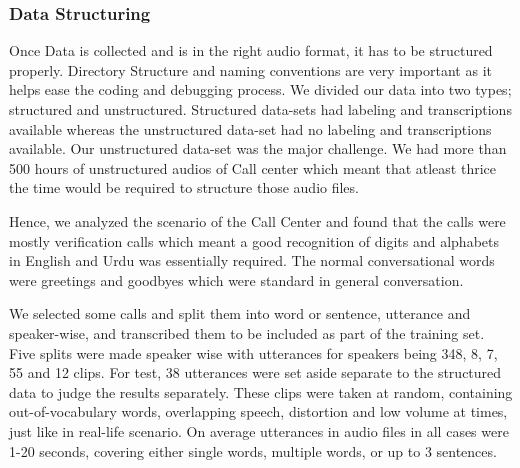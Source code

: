 \documentclass[a4paper, 11pt]{article}
\begin{document}

\subsubsection{Data Structuring}
\label{sub:datasources}


Once Data is collected and is in the right audio format, it has to be structured properly. Directory Structure and naming conventions are very important as it helps ease the coding and debugging process. We divided our data into two types; structured and unstructured. Structured data-sets had labeling and transcriptions available whereas the unstructured data-set had no labeling and transcriptions available. Our unstructured data-set was the major challenge. We had more than 500 hours of unstructured audios of Call center which meant that atleast thrice the time would be required to structure those audio files. 

Hence, we analyzed the scenario of the Call Center and found that the calls were mostly verification calls which meant a good recognition of digits and alphabets in English and Urdu was essentially required. The normal conversational words were greetings and goodbyes which were standard in general conversation.

We selected some calls and split them into word or sentence, utterance and speaker-wise, and transcribed them to be included as part of the training set. Five splits were made speaker wise with utterances for speakers being 348, 8, 7, 55 and 12 clips. For test, 38 utterances were set aside separate to the structured data to judge the results separately. These clips were taken at random, containing out-of-vocabulary words, overlapping speech, distortion and low volume at times, just like in real-life scenario. On average utterances in audio files in all cases were 1-20 seconds, covering either single words, multiple words, or up to 3 sentences.
\end{document}
